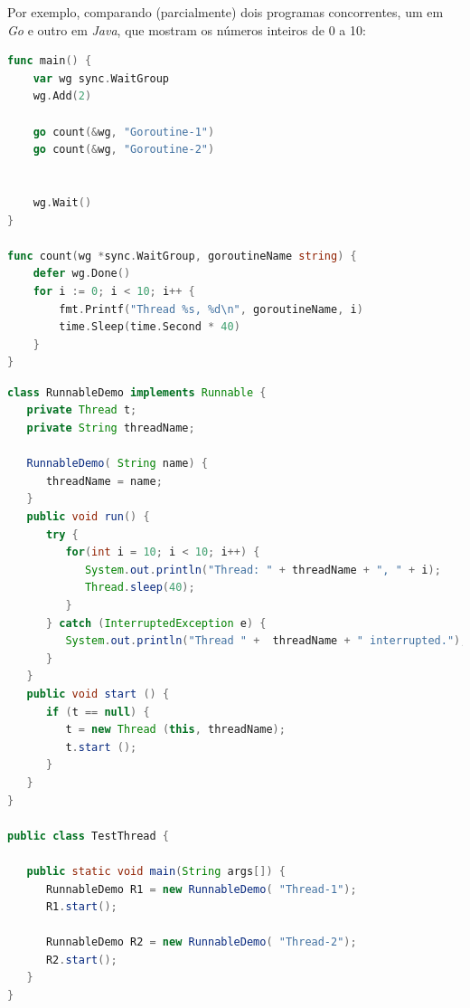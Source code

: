 

Por exemplo, comparando (parcialmente) dois programas concorrentes, um em \emph{Go} e outro em \emph{Java}, que mostram os números inteiros de 0 a 10:
\begin{lstlisting}[caption={Exemplo em \emph{Go}, usando a \emph{keyword} ``go'' para começar uma \emph{Goroutine}.},language=Go]
func main() {
	var wg sync.WaitGroup
	wg.Add(2)

	go count(&wg, "Goroutine-1")
	go count(&wg, "Goroutine-2")


	wg.Wait()
}

func count(wg *sync.WaitGroup, goroutineName string) {
	defer wg.Done()
	for i := 0; i < 10; i++ {
		fmt.Printf("Thread %s, %d\n", goroutineName, i)
		time.Sleep(time.Second * 40)
	}
}
\end{lstlisting}


\begin{lstlisting}[caption={Exemplo em \emph{Java}, usando a \emph{interface} ``Runnable'' e uma classe``RunnableDemo'' para começar \emph{threads}.},language=Java]
class RunnableDemo implements Runnable {
   private Thread t;
   private String threadName;
   
   RunnableDemo( String name) {
      threadName = name;
   }
   public void run() {
      try {
         for(int i = 10; i < 10; i++) {
            System.out.println("Thread: " + threadName + ", " + i);
            Thread.sleep(40);
         }
      } catch (InterruptedException e) {
         System.out.println("Thread " +  threadName + " interrupted.");
      }
   }
   public void start () {
      if (t == null) {
         t = new Thread (this, threadName);
         t.start ();
      }
   }
}

public class TestThread {

   public static void main(String args[]) {
      RunnableDemo R1 = new RunnableDemo( "Thread-1");
      R1.start();
      
      RunnableDemo R2 = new RunnableDemo( "Thread-2");
      R2.start();
   }   
}

\end{lstlisting}

